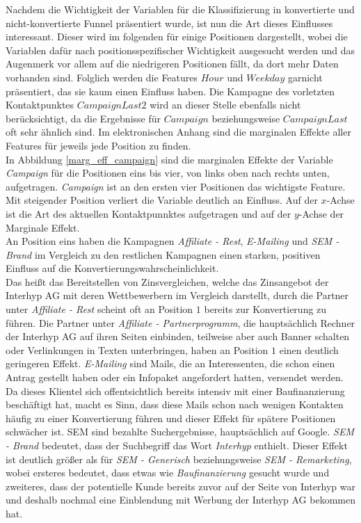 Nachdem die Wichtigkeit der Variablen für die Klassifizierung in konvertierte und nicht-konvertierte Funnel präsentiert wurde, ist nun die Art dieses Einflusses interessant. Dieser wird im folgenden für einige Positionen dargestellt, wobei die Variablen dafür nach positionsspezifischer Wichtigkeit ausgesucht werden und das Augenmerk vor allem auf die niedrigeren Positionen fällt, da dort mehr Daten vorhanden sind. Folglich werden die Features $Hour$ und $Weekday$ garnicht präsentiert, das sie kaum einen Einfluss haben. Die Kampagne des vorletzten Kontaktpunktes $CampaignLast2$ wird an dieser Stelle ebenfalls nicht berücksichtigt, da die Ergebnisse für $Campaign$ beziehungsweise $CampaignLast$ oft sehr ähnlich sind. Im elektronischen Anhang sind die marginalen Effekte aller Features für jeweils jede Position zu finden.\\
In Abbildung \ref{marg_eff_campaign} sind die marginalen Effekte der Variable \textit{Campaign} für die Positionen eins bis vier, von links oben nach rechts unten, aufgetragen. \textit{Campaign} ist an den ersten vier Positionen das wichtigste Feature. Mit steigender Position verliert die Variable deutlich an Einfluss. Auf der $x$-Achse ist die Art des aktuellen Kontaktpunnktes aufgetragen und auf der $y$-Achse der Marginale Effekt.\\
An Position eins haben die Kampagnen \textit{Affiliate - Rest}, \textit{E-Mailing} und \textit{SEM - Brand} im Vergleich zu den restlichen Kampagnen einen starken, positiven Einfluss auf die Konvertierungswahrscheinlichkeit.\\
Das heißt das Bereitstellen von Zinsvergleichen, welche das Zinsangebot der Interhyp AG mit deren Wettbewerbern im Vergleich darstellt, durch die Partner unter \textit{Affiliate - Rest} scheint oft an Position $1$ bereits zur Konvertierung zu führen. Die Partner unter \textit{Affiliate - Partnerprogramm}, die hauptsächlich Rechner der Interhyp AG auf ihren Seiten einbinden, teilweise aber auch Banner schalten oder Verlinkungen in Texten unterbringen, haben an Position $1$ einen deutlich geringeren Effekt. \textit{E-Mailing} sind Mails, die an Interessenten, die schon einen Antrag gestellt haben oder ein Infopaket angefordert hatten, versendet werden. Da dieses Klientel sich offentsichtlich bereits intensiv mit einer Baufinanzierung beschäftigt hat, macht es Sinn, dass diese Mails schon nach wenigen Kontakten häufig zu einer Konvertierung führen und dieser Effekt für spätere Positionen schwächer ist. SEM sind bezahlte Suchergebnisse, hauptsächlich auf Google. \textit{SEM - Brand} bedeutet, dass der Suchbegriff das Wort \textit{Interhyp} enthielt. Dieser Effekt ist deutlich größer als für \textit{SEM - Generisch} beziehungsweise \textit{SEM - Remarketing}, wobei ersteres bedeutet, dass etwas wie \textit{Baufinanzierung} gesucht wurde und zweiteres, dass der potentielle Kunde bereits zuvor auf der Seite von Interhyp war und deshalb nochmal eine Einblendung mit Werbung der Interhyp AG bekommen hat.\\
